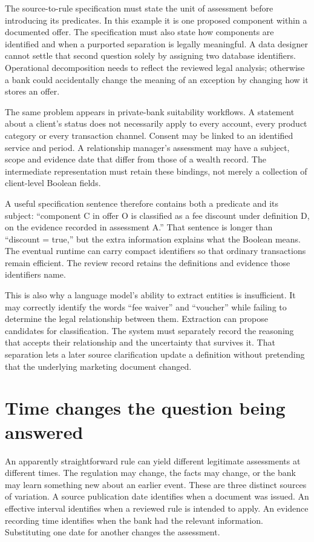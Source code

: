 \documentclass[12pt,a4paper,oneside,openany]{book}
\begin{document}
The source-to-rule specification must state the unit of assessment before
introducing its predicates. In this example it is one proposed component within
a documented offer. The specification must also state how components are
identified and when a purported separation is legally meaningful. A data
designer cannot settle that second question solely by assigning two database
identifiers. Operational decomposition needs to reflect the reviewed legal
analysis; otherwise a bank could accidentally change the meaning of an exception
by changing how it stores an offer.

The same problem appears in private-bank suitability workflows. A statement
about a client's status does not necessarily apply to every account, every
product category or every transaction channel. Consent may be linked to an
identified service and period. A relationship manager's assessment may have a
subject, scope and evidence date that differ from those of a wealth record.
The intermediate representation must retain these bindings, not merely a
collection of client-level Boolean fields.

A useful specification sentence therefore contains both a predicate and its
subject: ``component C in offer O is classified as a fee discount under
definition D, on the evidence recorded in assessment A.'' That sentence is longer
than ``discount = true,'' but the extra information explains what the Boolean
means. The eventual runtime can carry compact identifiers so that ordinary
transactions remain efficient. The review record retains the definitions and
evidence those identifiers name.

This is also why a language model's ability to extract entities is insufficient.
It may correctly identify the words ``fee waiver'' and ``voucher'' while failing
to determine the legal relationship between them. Extraction can propose
candidates for classification. The system must separately record the reasoning
that accepts their relationship and the uncertainty that survives it. That
separation lets a later source clarification update a definition without
pretending that the underlying marketing document changed.

\section{Time changes the question being answered}
\label{sec:problem-time}
An apparently straightforward rule can yield different legitimate assessments
at different times. The regulation may change, the facts may change, or the
bank may learn something new about an earlier event. These are three distinct
sources of variation. A source publication date identifies when a document was
issued. An effective interval identifies when a reviewed rule is intended to
apply. An evidence recording time identifies when the bank had the relevant
information. Substituting one date for another changes the assessment.
\end{document}
